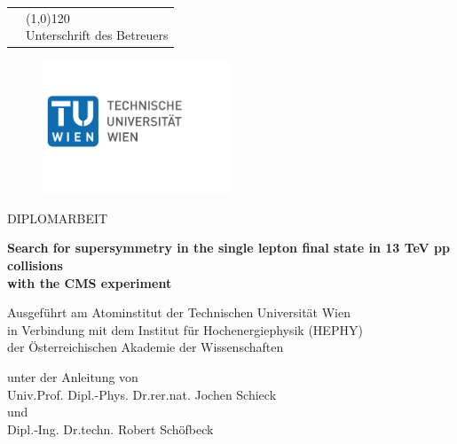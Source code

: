 
\begin{titlepage}

\begin{tabular}{ >{\centering}p{9cm} >{\centering}p{7cm} }
	\space & {\line(1,0){120}\\Unterschrift des Betreuers}
\end{tabular}

\begin{center}

\begin{figure}[h]
	\centering
		{\includegraphics[width=0.5\textwidth]{TU_Wien_Logo.pdf}}
\end{figure}

\begin{LARGE}

\par\noindent%
	{DIPLOMARBEIT}


\textbf{Search for supersymmetry in the single lepton final state in 13 TeV pp collisions\\with the CMS experiment} \\

\end{LARGE}

\begin{large}
Ausgef\"uhrt am Atominstitut der Technischen Universit\"at Wien\\
in Verbindung mit dem Institut f\"ur Hochenergiephysik (HEPHY)\\
der \"Osterreichischen Akademie der Wissenschaften

unter der Anleitung von \\
Univ.Prof. Dipl.-Phys. Dr.rer.nat. Jochen Schieck\\
und\\
Dipl.-Ing. Dr.techn. Robert Sch\"ofbeck


\end{large}
\end{center}
\end{titlepage}
